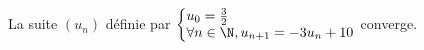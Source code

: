 La suite $(u_n)$ définie par $\left\{ \begin{array}{@{} l @{}} u_0 = \frac 32 \\ \forall n\in \N, u_{n+1}=-3u_{n}+10 \end{array} \right.$ converge.

\begin{reponses}
\end{reponses}

